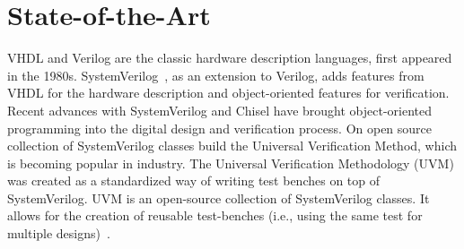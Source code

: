 \documentclass[fleqn,12pt]{article}
\newcommand{\todo}[1]{{\it TODO: #1}}
\begin{document}
\section*{State-of-the-Art}

%
%
%
%
%
%


VHDL and Verilog are the classic hardware description languages, first appeared in the 1980s.
SystemVerilog~\cite{SystemVerilog}, as an extension to Verilog, adds features from VHDL
for the hardware description and object-oriented features for verification.
Recent advances with SystemVerilog and Chisel \cite{chisel:dac2012, chisel:book} have
brought object-oriented programming into the digital design and verification process.
On open source collection of SystemVerilog classes build the Universal Verification Method,
which is becoming popular in industry.
The Universal Verification Methodology (UVM) was created as a standardized
way of writing test benches on top of SystemVerilog.
UVM is an open-source collection of SystemVerilog classes.
It allows for the creation of reusable test-benches (i.e., using the same test for multiple designs)~\cite{uvm2015}.


\end{document}
